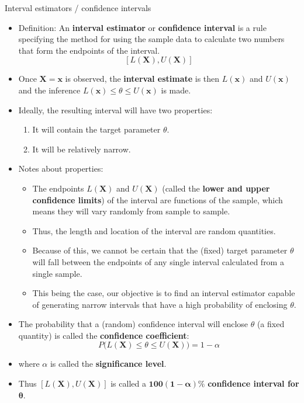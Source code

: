 \documentclass{article}
\begin{document}
Interval estimators / confidence intervals\bigskip
\begin{itemize}
    \item Definition: An \textbf{interval estimator} or \textbf{confidence interval} is a rule specifying the method for using the sample data to calculate two numbers that form the endpoints of the interval.
    \[[L(\mathbf{X}), U(\mathbf{X})]\]
    \item[] Once $\mathbf{X} = \mathbf{x}$ is observed, the \textbf{interval estimate} is then $L(\mathbf{x})$ and $U(\mathbf{x})$ and the inference $L(\mathbf{x}) \le \theta \le U(\mathbf{x})$ is made.\bigskip
    \item Ideally, the resulting interval will have two properties:
    \begin{enumerate}
        \item It will contain the target parameter $\theta$.
        \item It will be relatively narrow.
    \end{enumerate}
    \item Notes about properties:
    \begin{itemize}
        \item The endpoints $L(\mathbf{X})$ and $U(\mathbf{X})$ (called the \textbf{lower and upper confidence limits}) of the interval are functions of the sample, which means they will vary randomly from sample to sample.
        \item[] Thus, the length and location of the interval are random quantities.\vspace{25pt}
        \item Because of this, we cannot be certain that the (fixed) target parameter $\theta$ will fall between the endpoints of any single interval calculated from a single sample.
        \item[] This being the case, our objective is to find an interval estimator capable of generating narrow intervals that have a high probability of enclosing $\theta$.
    \end{itemize}\bigskip
    \item The probability that a (random) confidence interval will enclose $\theta$ (a fixed quantity) is called the \textbf{confidence coefficient}:
    \[P\big(L(\mathbf{X}) \le \theta \le U(\mathbf{X})\big) = 1 - \alpha\]
    \item[] where $\alpha$ is called the \textbf{significance level}.
    \item[] Thus $[L(\mathbf{X}), U(\mathbf{X})]$ is called a $\boldsymbol{100 (1 - \alpha)\%}$ \textbf{confidence interval for }$\boldsymbol{\theta}$.  
\end{itemize}\bigskip
\end{document}
